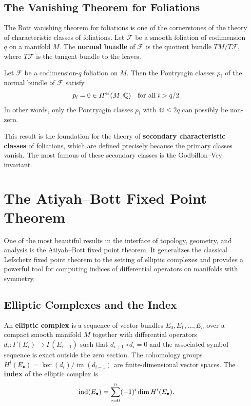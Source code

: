 \subsection{The Vanishing Theorem for Foliations}

The Bott vanishing theorem for foliations is one of the cornerstones of the theory of characteristic classes of foliations. Let \(\mathcal{F}\) be a smooth foliation of codimension \(q\) on a manifold \(M\). The \textbf{normal bundle} of \(\mathcal{F}\) is the quotient bundle \(TM / T\mathcal{F}\), where \(T\mathcal{F}\) is the tangent bundle to the leaves.

\begin{theorem}
Let \(\mathcal{F}\) be a codimension-\(q\) foliation on \(M\). Then the Pontryagin classes \(p_i\) of the normal bundle of \(\mathcal{F}\) satisfy
\[
p_i = 0 \in H^{4i}(M; \mathbb{Q}) \quad \text{for all } i > q/2.
\]
In other words, only the Pontryagin classes \(p_i\) with \(4i \leq 2q\) can possibly be non-zero.
\end{theorem}

This result is the foundation for the theory of \textbf{secondary characteristic classes} of foliations, which are defined precisely because the primary classes vanish. The most famous of these secondary classes is the Godbillon--Vey invariant.

\section{The Atiyah--Bott Fixed Point Theorem}

One of the most beautiful results in the interface of topology, geometry, and analysis is the Atiyah--Bott fixed point theorem. It generalizes the classical Lefschetz fixed point theorem to the setting of elliptic complexes and provides a powerful tool for computing indices of differential operators on manifolds with symmetry.

\subsection{Elliptic Complexes and the Index}

An \textbf{elliptic complex} is a sequence of vector bundles \(E_0, E_1, \dots, E_n\) over a compact smooth manifold \(M\) together with differential operators \(d_i: \Gamma(E_i) \to \Gamma(E_{i+1})\) such that \(d_{i+1} \circ d_i = 0\) and the associated symbol sequence is exact outside the zero section. The cohomology groups \(H^i(E_\bullet) = \ker(d_i)/\operatorname{im}(d_{i-1})\) are finite-dimensional vector spaces. The \textbf{index} of the elliptic complex is
\[
\operatorname{ind}(E_\bullet) = \sum_{i=0}^n (-1)^i \dim H^i(E_\bullet).
\]

